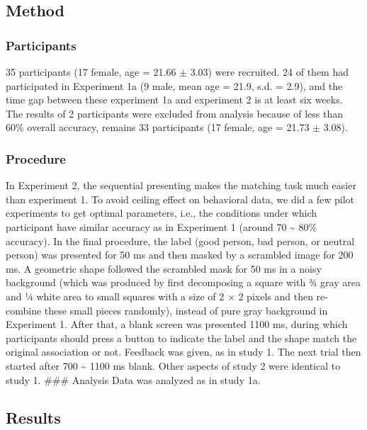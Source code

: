 \documentclass[man]{apa6}
\begin{document}
\hypertarget{method-2}{%
\subsection{Method}\label{method-2}}

\hypertarget{participants-3}{%
\subsubsection{Participants}\label{participants-3}}

35 participants (17 female, age = 21.66 \(\pm\) 3.03) were recruited. 24 of them had participated in Experiment 1a (9 male, mean age = 21.9, s.d. = 2.9), and the time gap between these experiment 1a and experiment 2 is at least six weeks. The results of 2 participants were excluded from analysis because of less than 60\% overall accuracy, remains 33 participants (17 female, age = 21.73 \(\pm\) 3.08).

\hypertarget{procedure-3}{%
\subsubsection{Procedure}\label{procedure-3}}

In Experiment 2, the sequential presenting makes the matching task much easier than experiment 1. To avoid ceiling effect on behavioral data, we did a few pilot experiments to get optimal parameters, i.e., the conditions under which participant have similar accuracy as in Experiment 1 (around 70 \textasciitilde{} 80\% accuracy).
In the final procedure, the label (good person, bad person, or neutral person) was presented for 50 ms and then masked by a scrambled image for 200 ms. A geometric shape followed the scrambled mask for 50 ms in a noisy background (which was produced by first decomposing a square with ¾ gray area and ¼ white area to small squares with a size of 2 × 2 pixels and then re-combine these small pieces randomly), instead of pure gray background in Experiment 1. After that, a blank screen was presented 1100 ms, during which participants should press a button to indicate the label and the shape match the original association or not. Feedback was given, as in study 1. The next trial then started after 700 \textasciitilde{} 1100 ms blank. Other aspects of study 2 were identical to study 1.
\#\#\# Analysis
Data was analyzed as in study 1a.

\hypertarget{results-3}{%
\subsection{Results}\label{results-3}}
\end{document}
